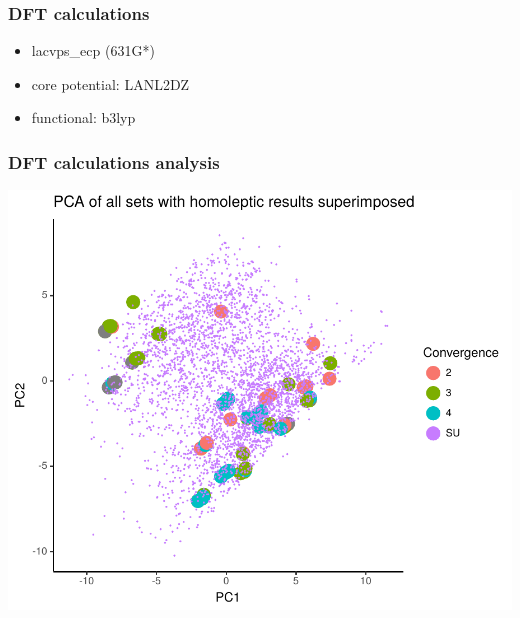 \documentclass[xcolor=dvipsnames]{beamer}
\begin{document}
\begin{frame}
\frametitle{DFT calculations}

\begin{itemize}
\item lacvps\_ecp (631G*)
\item core potential: LANL2DZ
\item functional: b3lyp
\end{itemize}
\end{frame}


\begin{frame}
\frametitle{DFT calculations analysis}
\includegraphics[width=0.6\linewidth]{img/pca_rf39_SplitIntoSU_convergence.pdf}
\end{frame}
\end{document}
